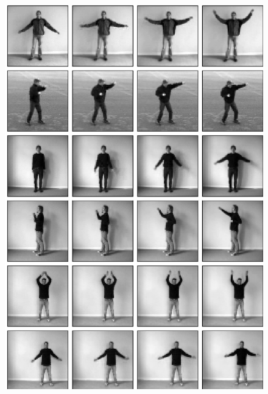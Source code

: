 \documentclass[12pt]{article}
\begin{document}
	\begin{figure}[h!]
		\begin{minipage}[position=l]{0.5\textwidth}
			\begin{mdframed}[style=inner]
				\includegraphics[scale=0.47]{movies_input}
			\end{mdframed}
		\end{minipage}
		\begin{minipage}[position=r]{0.5\textwidth}
			\begin{mdframed}[style=inner]

\end{mdframed}
\end{minipage}
\end{figure}
\end{document}
